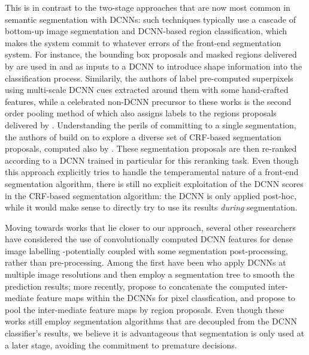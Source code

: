 
This is in contrast to the two-stage approaches that are now most common in semantic segmentation with DCNNs: such techniques typically use a cascade of bottom-up image segmentation and DCNN-based region classification, which makes the system commit to whatever errors of the front-end segmentation system.  
For instance, the bounding box proposals and masked regions delivered by \citep{arbelaez2014multiscale, Uijlings13} are used in 
\citet{girshick2014rcnn} and \cite{hariharan2014simultaneous}  as inputs to a DCNN to introduce  shape information into the classification process. Similarily, the authors of  \citet{mostajabi2014feedforward} label pre-computed superpixels using multi-scale DCNN cues extracted around them with some hand-crafted features, while a celebrated  non-DCNN precursor to these  works
is the second order pooling method of \citep{carreira2012semantic} which also assigns labels to the regions proposals delivered by \citep{carreira2012cpmc}. 
Understanding the perils of committing to a single segmentation, the authors of \citet{cogswell2014combining} 
build on \citep{yadollahpour2013discriminative} to explore a diverse set of CRF-based segmentation proposals, computed also by \citep{carreira2012cpmc}. These segmentation proposals are then re-ranked according to a DCNN trained in  particular for this reranking task. Even though this approach explicitly tries to handle the temperamental nature of a front-end segmentation algorithm, there is still no explicit exploitation of the DCNN scores in  the CRF-based segmentation algorithm: the DCNN is only applied post-hoc, while it would make sense to directly try to use its results {\em during} segmentation. 

Moving towards works that lie closer to our approach, several other researchers have considered the use of convolutionally computed DCNN features for dense image labelling -potentially coupled with some segmentation post-processing, rather than pre-processing. Among the first have been
\citet{farabet2013learning} who apply DCNNs at multiple image resolutions and then employ a segmentation tree to smooth the prediction results; more recently, \citet{hariharan2014hypercolumns} propose to concatenate the computed inter-mediate feature maps within the DCNNs for pixel classfication, and \citet{dai2014convolutional} propose to pool the inter-mediate feature maps by region proposals. Even though these works still employ  segmentation algorithms that are  decoupled from the DCNN classifier's results, we believe it is advantageous that segmentation is only used at a later stage, avoiding the commitment  to premature decisions. 

